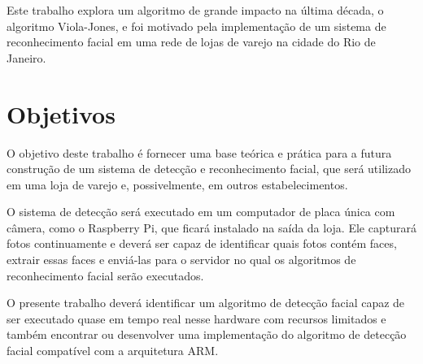 Este trabalho explora um algoritmo de grande impacto na última década, o algoritmo Viola-Jones, e foi motivado pela implementação de um sistema de reconhecimento facial em uma rede de lojas de varejo na cidade do Rio de Janeiro.

\section*{Objetivos}\label{sec:objetivos}

O objetivo deste trabalho é fornecer uma base teórica e prática para a futura construção de um sistema de detecção e reconhecimento facial, que será utilizado em uma loja de varejo e, possivelmente, em outros estabelecimentos.

O sistema de detecção será executado em um computador de placa única com câmera, como o Raspberry Pi, que ficará instalado na saída da loja.
Ele capturará fotos continuamente e deverá ser capaz de identificar quais fotos contém faces, extrair essas faces e enviá-las para o servidor no qual os algoritmos de reconhecimento facial serão executados.

O presente trabalho deverá identificar um algoritmo de detecção facial capaz de ser executado quase em tempo real nesse hardware com recursos limitados e também encontrar ou desenvolver uma implementação do algoritmo de detecção facial compatível com a arquitetura ARM.